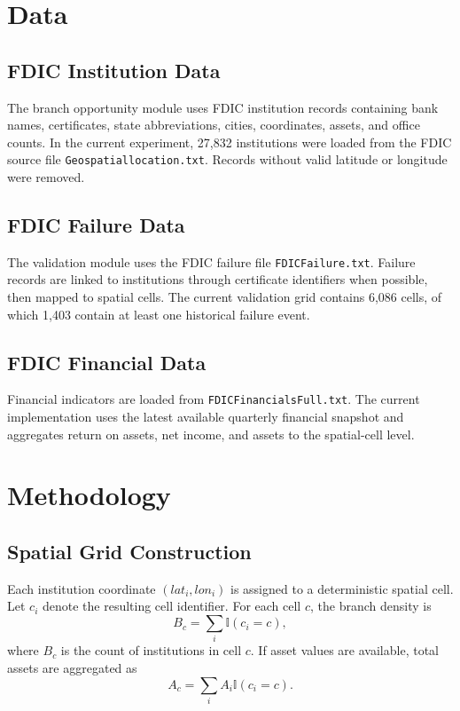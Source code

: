 \documentclass[conference]{IEEEtran}
\begin{document}
\section{Data}
\subsection{FDIC Institution Data}
The branch opportunity module uses FDIC institution records containing bank
names, certificates, state abbreviations, cities, coordinates, assets, and
office counts. In the current experiment, 27,832 institutions were loaded
from the FDIC source file \texttt{Geospatiallocation.txt}. Records without
valid latitude or longitude were removed.

\subsection{FDIC Failure Data}
The validation module uses the FDIC failure file
\texttt{FDICFailure.txt}. Failure records are linked to institutions through
certificate identifiers when possible, then mapped to spatial cells. The
current validation grid contains 6,086 cells, of which 1,403 contain at
least one historical failure event.

\subsection{FDIC Financial Data}
Financial indicators are loaded from \texttt{FDICFinancialsFull.txt}. The
current implementation uses the latest available quarterly financial
snapshot and aggregates return on assets, net income, and assets to the
spatial-cell level.

\section{Methodology}
\subsection{Spatial Grid Construction}
Each institution coordinate $(lat_i, lon_i)$ is assigned to a deterministic
spatial cell. Let $c_i$ denote the resulting cell identifier. For each cell
$c$, the branch density is
\begin{equation}
    B_c = \sum_i \mathbb{I}(c_i = c),
\end{equation}
where $B_c$ is the count of institutions in cell $c$. If asset values are
available, total assets are aggregated as
\begin{equation}
    A_c = \sum_i A_i \mathbb{I}(c_i = c).
\end{equation}
\end{document}
